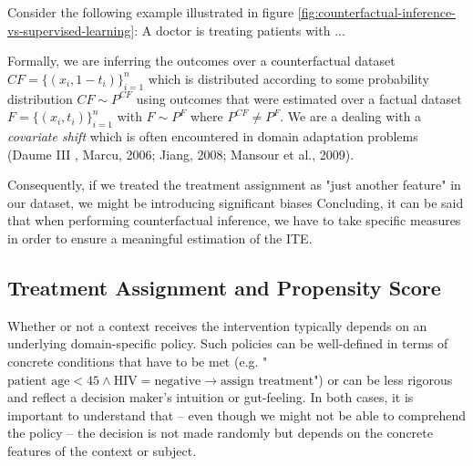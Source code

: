 Consider the following example illustrated in figure \ref{fig:counterfactual-inference-vs-supervised-learning}: A doctor is treating patients with ... %

Formally, we are inferring the outcomes over a counterfactual dataset $CF = \{(x_i, 1 - t_i) \}^{n}_{i=1}$ which is distributed according to some probability distribution $CF \sim P^{CF}$ using outcomes that were estimated over a factual dataset $F = \{(x_i, t_i) \}^{n}_{i=1}$ with $F \sim P^{F}$ where $P^{CF} \neq P^F$. We are a dealing with a \emph{covariate shift} which is often encountered in domain adaptation problems (Daume III , Marcu, 2006; Jiang, 2008; Mansour et al., 2009). %

Consequently, if we treated the treatment assignment as "just another feature" in our dataset, we might be introducing significant biases 
Concluding, it can be said that when performing counterfactual inference, we have to take specific measures in order to ensure a meaningful estimation of the ITE. 


\subsection{Treatment Assignment and Propensity Score} \label{sec:propensity-score}
Whether or not a context receives the intervention typically depends on an underlying domain-specific policy. Such policies can be well-defined in terms of concrete conditions that have to be met (e.g. "$\text{patient age} < 45 \wedge \text{HIV} = \text{negative} \rightarrow \text{assign treatment}$") or can be less rigorous and reflect a decision maker's intuition or gut-feeling. In both cases, it is important to understand that -- even though we might not be able to comprehend the policy -- the decision is not made randomly but depends on the concrete features of the context or subject. 


